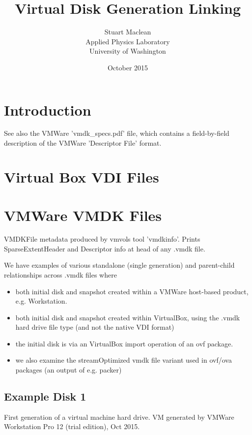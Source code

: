 \documentclass{article}
\title{Virtual Disk Generation Linking}
\author{Stuart Maclean \\
Applied Physics Laboratory \\
University of Washington}
\date{October 2015}
\begin{document}
\maketitle

\section{Introduction}

See also the VMWare 'vmdk\_specs.pdf' file, which contains a
field-by-field description of the VMWare 'Descriptor File' format.

\section{Virtual Box VDI Files}

\section{VMWare VMDK Files}

VMDKFile metadata produced by vmvols tool 'vmdkinfo'.  Prints
SparseExtentHeader and Descriptor info at head of any .vmdk file.

We have examples of various standalone (single generation) and
parent-child relationships across .vmdk files where

\begin{itemize}
\item both initial disk and snapshot
  created within a VMWare host-based product, e.g. Workstation.

\item both initial disk and snapshot
  created within VirtualBox, using the .vmdk hard drive file type (and
  not the native VDI format)

\item the initial disk is via an VirtualBox import operation of an ovf
  package.

\item we also examine the streamOptimized vmdk file variant used in
  ovf/ova packages (an output of e.g. packer)
\end{itemize}

\subsection{Example Disk 1}

First generation of a virtual machine hard drive. VM generated by
VMWare Workstation Pro 12 (trial edition), Oct 2015.
\end{document}
